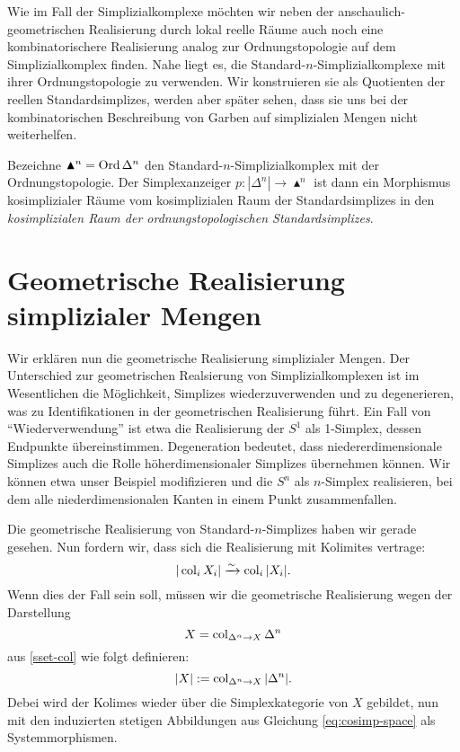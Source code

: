 \begin{bem} \label{clumsy-real}
  Wie im Fall der Simplizialkomplexe möchten wir neben der
  anschaulich-geometrischen Realisierung durch lokal reelle Räume auch
  noch eine kombinatorischere Realisierung analog zur
  Ordnungstopologie auf dem Simplizialkomplex finden. Nahe liegt es,
  die Standard-$n$-Simplizialkomplexe mit ihrer Ordnungstopologie zu
  verwenden. Wir konstruieren sie als Quotienten der reellen
  Standardsimplizes, werden aber später sehen, dass sie uns bei der
  kombinatorischen Beschreibung von Garben auf simplizialen Mengen
  nicht weiterhelfen.

  Bezeichne $\blacktriangle^n = \operatorname{Ord} \Delta^n$ den
  Standard-$n$-Simplizialkomplex mit der Ordnungstopologie. Der
  Simplexanzeiger $p: |\Delta^n| \to \blacktriangle^n$ ist dann ein
  Morphismus kosimplizialer Räume vom kosimplizialen Raum der
  Standardsimplizes in den \emph{kosimplizialen Raum der
    ordnungstopologischen Standardsimplizes}.
\end{bem}

\section{Geometrische Realisierung simplizialer Mengen}

Wir erklären nun die geometrische Realisierung simplizialer
Mengen. Der Unterschied zur geometrischen Realsierung von
Simplizialkomplexen ist im Wesentlichen die Möglichkeit, Simplizes
wiederzuverwenden und zu degenerieren, was zu Identifikationen in der
geometrischen Realisierung führt. Ein Fall von ``Wiederverwendung''
ist etwa die Realisierung der $S^1$ als 1-Simplex, dessen Endpunkte
übereinstimmen. Degeneration bedeutet, dass niedererdimensionale
Simplizes auch die Rolle höherdimensionaler Simplizes übernehmen
können. Wir können etwa unser Beispiel modifizieren und die $S^n$ als
$n$-Simplex realisieren, bei dem alle niederdimensionalen Kanten in
einem Punkt zusammenfallen.

Die geometrische Realisierung von Standard-$n$-Simplizes haben wir
gerade gesehen. Nun fordern wir, dass sich die Realisierung mit
Kolimites vertrage:
\begin{equation} \label{eq:real-cocont}
  |\operatorname{col}_i X_i| \xrightarrow[]{\sim} \operatorname{col}_i |X_i|.
\end{equation}
Wenn dies der Fall sein soll, müssen wir die geometrische Realisierung
wegen der Darstellung
\[ X = \operatorname{col}_{\Delta^n \to X} \Delta^n \]
aus \ref{sset-col} wie folgt definieren:
\begin{equation} \label{eq:real-colim}
  |X| := \operatorname{col}_{\Delta^n \to X} |\Delta^n|.
\end{equation}
Debei wird der Kolimes wieder über die Simplexkategorie von $X$
gebildet, nun mit den induzierten stetigen Abbildungen aus Gleichung
\ref{eq:cosimp-space} als Systemmorphismen.

